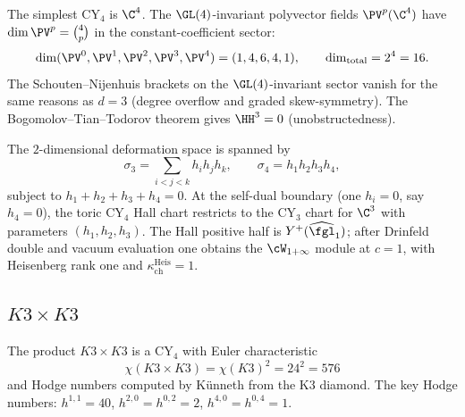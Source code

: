 The simplest CY$_4$ is $\C^4$. The $\GL(4)$-invariant polyvector fields $\PV^p(\C^4)$ have $\dim \PV^p = \binom{4}{p}$ in the constant-coefficient sector:
\[
 \dim(\PV^0, \PV^1, \PV^2, \PV^3, \PV^4) = (1, 4, 6, 4, 1), \qquad \dim_{\mathrm{total}} = 2^4 = 16.
\]
The Schouten--Nijenhuis brackets on the $\GL(4)$-invariant sector vanish for the same reasons as $d = 3$ (degree overflow and graded skew-symmetry). The Bogomolov--Tian--Todorov theorem gives $\HH^3 = 0$ (unobstructedness).

The $2$-dimensional deformation space is spanned by
\[
 \sigma_3 = \sum_{i < j < k} h_i h_j h_k, \qquad \sigma_4 = h_1 h_2 h_3 h_4,
\]
subject to $h_1 + h_2 + h_3 + h_4 = 0$. At the self-dual boundary (one $h_i = 0$, say $h_4 = 0$), the toric CY$_4$ Hall chart restricts to the CY$_3$ chart for $\C^3$ with parameters $(h_1,h_2,h_3)$. The Hall positive half is \(Y^+(\widehat{\fgl}_1)\); after Drinfeld double and vacuum evaluation one obtains the $\cW_{1+\infty}$ module at \(c=1\), with Heisenberg rank one and \(\kappa_{\mathrm{ch}}^{\mathrm{Heis}}=1\).


\subsection{\texorpdfstring{$K3 \times K3$}{K3 x K3}}
\label{subsec:k3xk3}

The product $K3 \times K3$ is a CY$_4$ with Euler characteristic
\[
 \chi(K3 \times K3) = \chi(K3)^2 = 24^2 = 576
\]
and Hodge numbers computed by K\"unneth from the K3 diamond. The key Hodge numbers:
$h^{1,1} = 40$, $h^{2,0} = h^{0,2} = 2$, $h^{4,0} = h^{0,4} = 1$.

